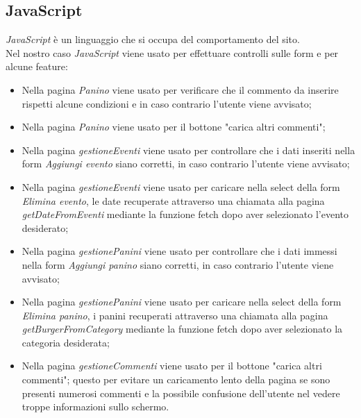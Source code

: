 \subsection{JavaScript}
\emph{JavaScript} è un linguaggio che si occupa del comportamento del sito.\\
Nel nostro caso \emph{JavaScript} viene usato per effettuare controlli sulle form e per alcune feature:
\begin{itemize}
    \item Nella pagina \emph{Panino} viene usato per verificare che il commento da inserire rispetti alcune condizioni e in caso contrario l'utente viene avvisato;
    \item Nella pagina \emph{Panino} viene usato per il bottone "carica altri commenti";
    \item Nella pagina \emph{gestioneEventi} viene usato per controllare che i dati inseriti nella form \emph{Aggiungi evento} siano corretti, in caso contrario l'utente viene avvisato;
    \item Nella pagina \emph{gestioneEventi} viene usato per caricare nella select della form \emph{Elimina evento}, le date recuperate attraverso una chiamata alla pagina \emph{getDateFromEventi} mediante la funzione fetch dopo aver selezionato l'evento desiderato;
    \item Nella pagina \emph{gestionePanini} viene usato per controllare che i dati immessi nella form \emph{Aggiungi panino} siano corretti, in caso contrario l'utente viene avvisato;
    \item Nella pagina \emph{gestionePanini} viene usato per caricare nella select della form \emph{Elimina panino}, i panini recuperati attraverso una chiamata alla pagina \emph{getBurgerFromCategory} mediante la funzione fetch dopo aver selezionato la categoria desiderata;
    \item Nella pagina \emph{gestioneCommenti} viene usato per il bottone "carica altri commenti"; questo per evitare un caricamento lento della pagina se sono presenti numerosi commenti e la possibile confusione dell'utente nel vedere troppe informazioni sullo schermo.
\end{itemize}